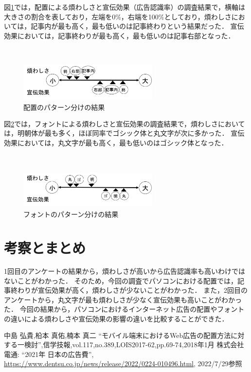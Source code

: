 \documentclass[twocolumn,10pt,a4j]{ltjsarticle}
\begin{document}
図\ref{fig:結果1}では，配置による煩わしさと宣伝効果（広告認識率）の調査結果で，横軸は大きさの割合を表しており，左端を0\%，右端を100\%としており，煩わしさにおいては，記事内が最も高く，最も低いのは記事終わりという結果だった．
宣伝効果においては，記事終わりが最も高く，最も低いのは記事右部となった．

　
\begin{figure}[h]
\begin{center}
 \includegraphics[clip,width=70mm,height=20mm]{結果1.png}
\end{center}
 \caption{配置のパターン分けの結果}
 \label{fig:結果1}
\end{figure}

図\ref{fig:結果2}では，フォントによる煩わしさと宣伝効果の調査結果で，煩わしさにおいては，明朝体が最も多く，ほぼ同率でゴシック体と丸文字が次に多かった．
宣伝効果においては，丸文字が最も高く，最も低いのはゴシック体となった．

　
\begin{figure}[h]
\begin{center}
 \includegraphics[clip,width=70mm,height=20mm]{結果2.png}
\end{center}
 \caption{フォントのパターン分けの結果}
 \label{fig:結果2}
\end{figure}

\section{考察とまとめ}
1回目のアンケートの結果から，煩わしさが高いから広告認識率も高いわけではないことがわかった．
そのため，今回の調査でパソコンにおける配置では，記事終わりが宣伝効果が高く，煩わしさが少ないことがわかった．
また，2回目のアンケートから，丸文字が最も煩わしさが少なく宣伝効果も高いことがわかった．
今回の結果から，パソコンにおけるインターネット広告の配置やフォントの違いによる煩わしさや宣伝効果の影響の違いを比較することができた．

\begin{thebibliography}{99}
 中島 弘貴,柗本 真佑,楠本 真二 ``モバイル端末におけるWeb広告の配置方法に対する一検討'',信学技報,vol.117,no.389,LOIS2017-62,pp.69-74,2018年1月
 株式会社電通: ``2021年 日本の広告費'', \url{https://www.dentsu.co.jp/news/release/2022/0224-010496.html}, 2022/7/29参照
\end{thebibliography}
\end{document}
